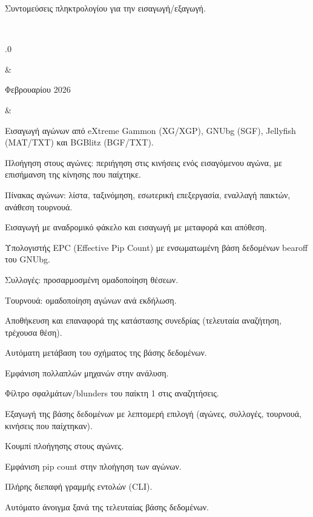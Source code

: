 \documentclass[letterpaper,10pt,greek]{sphinxmanual}
\begin{document}
\begin{savenotes}
\begin{longtable}{}
\begin{varwidth}[t]{}
\sphinxAtStartPar
Συντομεύσεις πληκτρολογίου για την εισαγωγή/εξαγωγή.
\sphinxbeforeendvarwidth
\end{varwidth}%
\\
\sphinxhline\begin{varwidth}[t]{}
.0
\sphinxbeforeendvarwidth
\end{varwidth}%
&\begin{varwidth}[t]{}
 Φεβρουαρίου 2026
\sphinxbeforeendvarwidth
\end{varwidth}%
&\begin{varwidth}[t]{}
\sphinxAtStartPar
Εισαγωγή αγώνων από eXtreme Gammon (XG/XGP), GNUbg (SGF), Jellyfish (MAT/TXT) και BGBlitz (BGF/TXT).

\sphinxAtStartPar
Πλοήγηση στους αγώνες: περιήγηση στις κινήσεις ενός εισαγόμενου αγώνα, με επισήμανση της κίνησης που παίχτηκε.

\sphinxAtStartPar
Πίνακας αγώνων: λίστα, ταξινόμηση, εσωτερική επεξεργασία, εναλλαγή παικτών, ανάθεση τουρνουά.

\sphinxAtStartPar
Εισαγωγή με αναδρομικό φάκελο και εισαγωγή με μεταφορά και απόθεση.

\sphinxAtStartPar
Υπολογιστής EPC (Effective Pip Count) με ενσωματωμένη βάση δεδομένων bearoff του GNUbg.

\sphinxAtStartPar
Συλλογές: προσαρμοσμένη ομαδοποίηση θέσεων.

\sphinxAtStartPar
Τουρνουά: ομαδοποίηση αγώνων ανά εκδήλωση.

\sphinxAtStartPar
Αποθήκευση και επαναφορά της κατάστασης συνεδρίας (τελευταία αναζήτηση, τρέχουσα θέση).

\sphinxAtStartPar
Αυτόματη μετάβαση του σχήματος της βάσης δεδομένων.

\sphinxAtStartPar
Εμφάνιση πολλαπλών μηχανών στην ανάλυση.

\sphinxAtStartPar
Φίλτρο σφαλμάτων/blunders του παίκτη 1 στις αναζητήσεις.

\sphinxAtStartPar
Εξαγωγή της βάσης δεδομένων με λεπτομερή επιλογή (αγώνες, συλλογές, τουρνουά, κινήσεις που παίχτηκαν).

\sphinxAtStartPar
Κουμπί πλοήγησης στους αγώνες.

\sphinxAtStartPar
Εμφάνιση pip count στην πλοήγηση των αγώνων.

\sphinxAtStartPar
Πλήρης διεπαφή γραμμής εντολών (CLI).

\sphinxAtStartPar
Αυτόματο άνοιγμα ξανά της τελευταίας βάσης δεδομένων.


\end{varwidth}
\end{longtable}
\end{savenotes}
\end{document}

